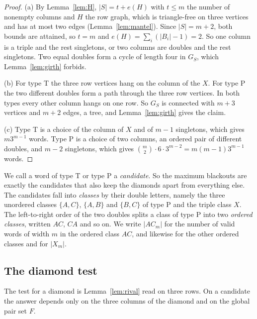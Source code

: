 \begin{proof}
(a) By Lemma~\ref{lem:H}, $|S|=t+e(H)$ with $t\le m$ the number of nonempty columns and $H$
the row graph, which is triangle-free on three vertices and has at most two edges
(Lemma~\ref{lem:mantel}). Since $|S|=m+2$, both bounds are attained, so $t=m$ and
$e(H)=\sum_i(|B_i|-1)=2$. So one column is a triple and the rest singletons, or two columns
are doubles and the rest singletons. Two equal doubles form a cycle of length four in $G_S$,
which Lemma~\ref{lem:girth} forbids.

(b) For type T the three row vertices hang on the column of the $X$. For type P the two
different doubles form a path through the three row vertices. In both types every other
column hangs on one row. So $G_S$ is connected with $m+3$ vertices and $m+2$ edges, a tree,
and Lemma~\ref{lem:girth} gives the claim.

(c) Type T is a choice of the column of $X$ and of $m-1$ singletons, which gives $m3^{m-1}$
words. Type P is a choice of two columns, an ordered pair of different doubles, and $m-2$
singletons, which gives $\binom m2\cdot6\cdot3^{m-2}=m(m-1)3^{m-1}$ words.
\end{proof}

We call a word of type T or type P a \emph{candidate}. So the maximum blackouts are exactly
the candidates that also keep the diamonds apart from everything else. The candidates fall
into \emph{classes} by their double letters, namely the three unordered classes $\{A,C\}$,
$\{A,B\}$ and $\{B,C\}$ of type P and the triple class $X$. The left-to-right order of the two
doubles splits a class of type P into two \emph{ordered classes}, written $AC$, $CA$ and so
on. We write $|AC_m|$ for the number of valid words of width $m$ in the ordered class $AC$,
and likewise for the other ordered classes and for $|X_m|$.

\subsection{The diamond test}

The test for a diamond is Lemma~\ref{lem:rival} read on three rows. On a candidate the answer
depends only on the three columns of the diamond and on the global pair set $F$.

